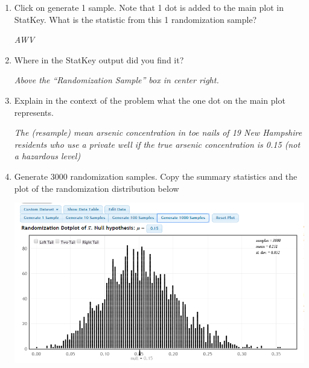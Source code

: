 \begin{enumerate}
\begin{key}
  {\it Look for data entry errors. }
\end{key}

\item Click on generate 1 sample.  Note that 1 dot is added to the
  main plot in StatKey.  What is the statistic from this 1
  randomization sample?
\begin{students}
  \vspace{1cm}
\end{students}

\begin{key}
  {\it AWV}
\end{key}

\item Where in the StatKey output did you find it?
\begin{students}
  \vspace{1cm}
\end{students}

\begin{key}
  {\it Above the ``Randomization Sample'' box in center right.}
\end{key}


\item Explain in the context of the problem what the one dot on the
  main plot represents. 
\begin{students}
  \vspace{1cm}
\end{students}

\begin{key}
  {\it The (resample) mean arsenic concentration in toe nails of 19
    New Hampshire residents who use a private well if the true arsenic
    concentration is 0.15 (not a hazardous level) }
\end{key}
\item Generate 3000 randomization samples.  Copy the summary statistics and
the plot of the randomization distribution below
\begin{students}
  \vspace{4cm}
\end{students}

\begin{key}
  {\it \includegraphics[width=.5\linewidth]{plots/arsenicNullDistn.png}}
\end{key}



\end{enumerate}
